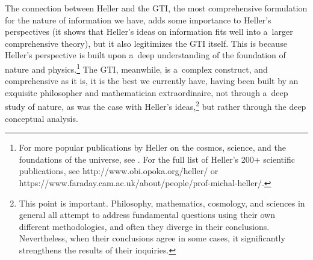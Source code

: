 The connection between Heller and the GTI, the most comprehensive formulation for the nature of information we have, adds some importance to Heller's perspectives (it shows that Heller's ideas on information fits well into a~larger comprehensive theory), but it also legitimizes the GTI itself. This is because Heller's perspective is built upon a~deep understanding of the foundation of nature and physics.\footnote{For more popular publications by Heller on the cosmos, science, and the foundations of the universe, see 
\parencites[][]{heller_ostateczne_2008}[][]{heller_podgladanie_2008}[][]{heller_philosophy_2011}[][]{heller_matematyka_2012}[][]{heller_filozofia_2013}[][]{heller_logos_2013}[][]{heller_przestrzenie_2017}[][]{heller_jedna_2020}. %
 For the full list of Heller's 200+ scientific publications, see http://www.obi.opoka.org/heller/ or https://www.faraday.cam.ac.uk/about/people/prof-michal-heller/.} The GTI, meanwhile, is a~complex construct, and comprehensive as it is, it is the best we currently have, having been built by an exquisite philosopher and mathematician extraordinaire, not through a~deep study of nature, as was the case with Heller's ideas,\footnote{This point is important. Philosophy, mathematics, cosmology, and sciences in general all attempt to address fundamental questions using their own different methodologies, and often they diverge in their conclusions. Nevertheless, when their conclusions agree in some cases, it significantly strengthens the results of their inquiries.} but rather through the deep conceptual analysis.



